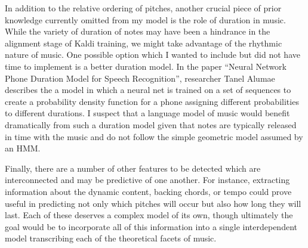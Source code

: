 \documentclass[conference]{IEEEtran}
\begin{document}
In addition to the relative ordering of pitches, another crucial piece of prior knowledge currently omitted from my model is the role of duration in music. While the variety of duration of notes may have been a hindrance in the alignment stage of Kaldi training, we might take advantage of the rhythmic nature of music. One possible option which I wanted to include but did not have time to implement is a better duration model. In the paper ``Neural Network Phone Duration Model for Speech Recognition'', researcher Tanel Alumae describes the a model in which a neural net is trained on a set of sequences to create a probability density function for a phone assigning different probabilities to different durations. I suspect that a language model of music would benefit dramatically from such a duration model given that notes are typically released in time with the music and do not follow the simple geometric model assumed by an HMM.

Finally, there are a number of other features to be detected which are interconnected and may be predictive of one another. For instance, extracting information about the dynamic content, backing chords, or tempo could prove useful in predicting not only which pitches will occur but also how long they will last. Each of these deserves a complex model of its own, though ultimately the goal would be to incorporate all of this information into a single interdependent model transcribing each of the theoretical facets of music.
\end{document}
